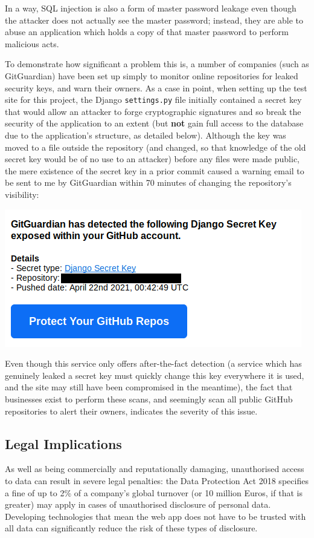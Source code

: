 \documentclass[12pt]{report}
\begin{document}
In a way, SQL injection is also a form of master password leakage even though the attacker does not actually see the master password; instead, they are able to abuse an application which holds a copy of that master password to perform malicious acts.

To demonstrate how significant a problem this is, a number of companies (such as GitGuardian\cite{GitGuardian}) have been set up simply to monitor online repositories for leaked security keys, and warn their owners. As a case in point, when setting up the test site for this project, the Django \texttt{settings.py} file initially contained a secret key that would allow an attacker to forge cryptographic signatures and so break the security of the application to an extent (but \textbf{not} gain full access to the database due to the application's structure, as detailed below). Although the key was moved to a file outside the repository (and changed, so that knowledge of the old secret key would be of no use to an attacker) before any files were made public, the mere existence of the secret key in a prior commit caused a warning email to be sent to me by GitGuardian within 70 minutes of changing the repository's visibility:

\begin{center}
  \includegraphics[scale=0.5]{01-gitguardian.png}
\end{center}

Even though this service only offers after-the-fact detection (a service which has genuinely leaked a secret key must quickly change this key everywhere it is used, and the site may still have been compromised in the meantime), the fact that businesses exist to perform these scans, and seemingly scan all public GitHub repositories to alert their owners, indicates the severity of this issue.

\subsection{Legal Implications}
As well as being commercially and reputationally damaging, unauthorised access to data can result in severe legal penalties: the Data Protection Act 2018 specifies a fine of up to 2\% of a company's global turnover (or 10 million Euros, if that is greater) may apply in cases of unauthorised disclosure of personal data\cite{GDPR}. Developing technologies that mean the web app does not have to be trusted with all data can significantly reduce the risk of these types of disclosure.
\end{document}
